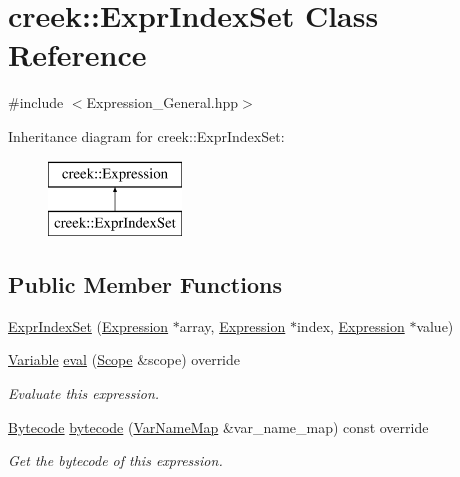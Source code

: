 \hypertarget{classcreek_1_1_expr_index_set}{}\section{creek\+:\+:Expr\+Index\+Set Class Reference}
\label{classcreek_1_1_expr_index_set}


{\ttfamily \#include $<$Expression\+\_\+\+General.\+hpp$>$}

Inheritance diagram for creek\+:\+:Expr\+Index\+Set\+:\begin{figure}[H]
\begin{center}
\leavevmode
\includegraphics[height=2.000000cm]{classcreek_1_1_expr_index_set}
\end{center}
\end{figure}
\subsection*{Public Member Functions}
\begin{DoxyCompactItemize}
\item 
\hyperlink{classcreek_1_1_expr_index_set_a2bb24c6928b9f3ee6998e16c74fd0315}{Expr\+Index\+Set} (\hyperlink{classcreek_1_1_expression}{Expression} $\ast$array, \hyperlink{classcreek_1_1_expression}{Expression} $\ast$index, \hyperlink{classcreek_1_1_expression}{Expression} $\ast$value)
\item 
\hyperlink{classcreek_1_1_variable}{Variable} \hyperlink{classcreek_1_1_expr_index_set_aafd64bba24bfe3b2a1cd6c4fa8dfaaee}{eval} (\hyperlink{classcreek_1_1_scope}{Scope} \&scope) override
\begin{DoxyCompactList}\small\item\em Evaluate this expression. \end{DoxyCompactList}\item 
\hyperlink{classcreek_1_1_bytecode}{Bytecode} \hyperlink{classcreek_1_1_expr_index_set_a73bb1d7d24dc5e6be5ca6967696b7559}{bytecode} (\hyperlink{classcreek_1_1_var_name_map}{Var\+Name\+Map} \&var\+\_\+name\+\_\+map) const  override\hypertarget{classcreek_1_1_expr_index_set_a73bb1d7d24dc5e6be5ca6967696b7559}{}\label{classcreek_1_1_expr_index_set_a73bb1d7d24dc5e6be5ca6967696b7559}

\begin{DoxyCompactList}\small\item\em Get the bytecode of this expression. \end{DoxyCompactList}\end{DoxyCompactItemize}


